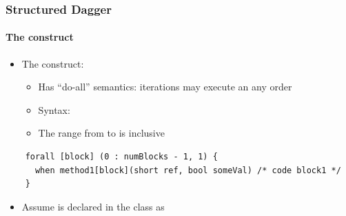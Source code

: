 \begin{frame}[fragile]
  \frametitle{Structured Dagger}
  \framesubtitle{The  construct}
  \begin{itemize}
  \item The  construct:
    \begin{itemize}
    \item Has ``do-all'' semantics: iterations may execute an any order
    \item Syntax: 
    \item The range from  to  is inclusive
    \end{itemize}
  \end{itemize}
  \begin{lstlisting}
    forall [block] (0 : numBlocks - 1, 1) {
      when method1[block](short ref, bool someVal) /* code block1 */
    }
  \end{lstlisting}
  \begin{itemize}
    \item Assume  is declared in the class as 
  \end{itemize}
\end{frame}

%   

%   

%   

%   

%   

